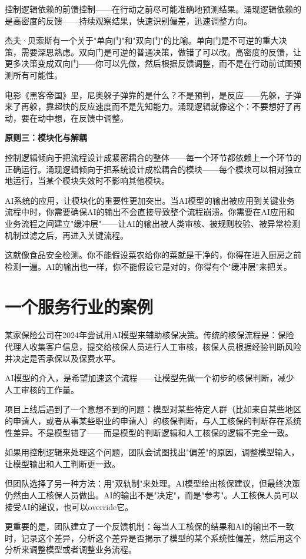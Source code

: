 控制逻辑依赖的前馈控制——在行动之前尽可能准确地预测结果。涌现逻辑依赖的是高密度的反馈——持续观察结果，快速识别偏差，迅速调整方向。

杰夫·贝索斯有一个关于"单向门"和"双向门"的比喻。单向门是不可逆的重大决策，需要深思熟虑。双向门是可逆的普通决策，做错了可以改。高密度的反馈，让更多决策变成双向门——你可以先做，然后根据反馈调整，而不是在行动前试图预测所有可能性。

电影《黑客帝国》里，尼奥躲子弹靠的是什么？不是预判，是反应——先躲，子弹来了再躲，靠超快的反应速度而不是先知能力。涌现逻辑就像这个：不要想好了再动，要在动中想，在反馈中调整。

\textbf{原则三：模块化与解耦}

控制逻辑倾向于把流程设计成紧密耦合的整体——每一个环节都依赖上一个环节的正确运行。涌现逻辑倾向于把系统设计成松耦合的模块——每个模块可以相对独立地运行，当某个模块失效时不影响其他模块。

AI系统的应用，让模块化的重要性更加突出。当AI模型的输出被应用到关键业务流程中时，你需要确保AI的输出不会直接导致整个流程崩溃。你需要在AI应用和业务流程之间建立"缓冲层"——让AI的输出被人类审核、被规则校验、被异常检测机制过滤之后，再进入关键流程。

这就像食品安全检测。你不能假设菜农给你的菜就是干净的，你得在进入厨房之前检测一遍。AI的输出也一样，你不能假设它是对的，你得有个"缓冲层"来把关。

\section{一个服务行业的案例}


某家保险公司在2024年尝试用AI模型来辅助核保决策。传统的核保流程是：保险代理人收集客户信息，提交给核保人员进行人工审核，核保人员根据经验判断风险并决定是否承保以及保费水平。

AI模型的介入，是希望加速这个流程——让模型先做一个初步的核保判断，减少人工审核的工作量。

项目上线后遇到了一个意想不到的问题：模型对某些特定人群（比如来自某些地区的申请人，或者从事某些职业的申请人）的核保判断，与人工核保的判断存在系统性差异。不是模型错了——而是模型的判断逻辑和人工核保的逻辑不完全一致。

如果用控制逻辑来处理这个问题，团队会试图找出"偏差"的原因，调整模型输入，让模型输出和人工判断更一致。

但团队选择了另一种方法：用"双轨制"来处理。AI模型给出核保建议，但最终决策仍然由人工核保人员做出。AI的输出不是"决定"，而是"参考"。人工核保人员可以接受AI的建议，也可以override它。

更重要的是，团队建立了一个反馈机制：每当人工核保的结果和AI的输出不一致时，记录这个差异，分析这个差异是否揭示了模型的某个系统性偏差，然后用这个分析来调整模型或者调整业务流程。

